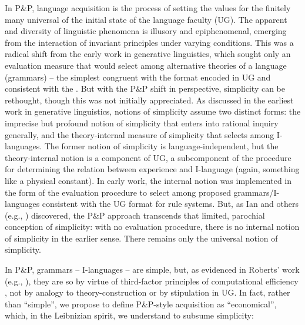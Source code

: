 \documentclass[output=paper]{langsci/langscibook}
\begin{document}
\largerpage
In P\&P, language acquisition is the process of setting the values for the
finitely many universal  of the initial state of the language faculty
(\gls{UG}). The apparent  and diversity of linguistic phenomena is illusory
and epi\-phenomenal, emerging from the interaction of invariant principles under
varying conditions. This was a radical shift from the early work in generative
linguistics, which sought only an evaluation measure that would select among
alternative theories of a language (grammars) – the simplest congruent with the
format encoded in \gls{UG} and consistent with the . But with
the P\&P shift in perspective, simplicity can be rethought, though this was
not initially appreciated. As discussed in the earliest work in generative
linguistics, notions of simplicity assume two distinct forms: the imprecise but
profound notion of simplicity that enters into rational inquiry generally, and
the theory-internal measure of simplicity that selects among I-languages. The
former notion of simplicity is language-independent, but the theory-internal
notion is a component of \gls{UG}, a subcomponent of the procedure for determining
the relation between experience and I-language (again, something like a
physical constant). In early work, the internal notion was implemented in the
form of the evaluation procedure to select among proposed grammars/I-languages
consistent with the \gls{UG} format for rule systems. But, as Ian \citet{Roberts2012}
and others (e.g., \citealt{SheeBibRobHol2017}) discovered, the P\&P approach
transcends that limited, parochial conception of simplicity: with no evaluation
procedure, there is no internal notion of simplicity in the earlier sense.
There remains only the universal notion of simplicity.

In P\&P, grammars – I-languages – are simple, but, as evidenced in Roberts’
work (e.g., \citealt{RobHol2010}), they are so by virtue of
third-factor principles of computational efficiency \citep{Chomsky2005}, not by
analogy to theory-construction or by stipulation in \gls{UG}. In fact, rather than
“simple”, we propose to define P\&P-style acquisition as “economical”, which,
in the Leibnizian spirit, we understand to subsume simplicity: 
\end{document}
